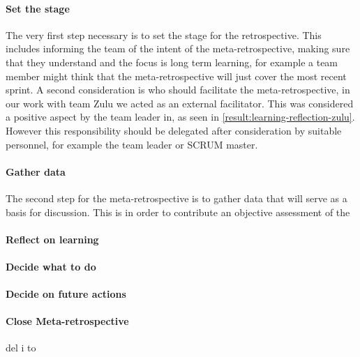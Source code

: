 \paragraph{Set the stage}
The very first step necessary is to set the stage for the retrospective. This includes informing the team of the intent of the meta-retrospective, making sure that they understand and the focus is long term learning, for example a team member might think that the meta-retrospective will just cover the most recent sprint. A second consideration is who should facilitate the meta-retrospective, in our work with team Zulu we acted as an external facilitator. This was considered a positive aspect by the team leader in, as seen in \autoref{result:learning-reflection-zulu}. However this responsibility should be delegated after consideration by suitable personnel, for example the team leader or SCRUM master. 

\paragraph{Gather data}
The second step for the meta-retrospective is to gather data that will serve as a basis for discussion. This is in order to contribute an objective assessment of the 

\paragraph{Reflect on learning}

\paragraph{Decide what to do}

\paragraph{Decide on future actions} %
\label{par:paragraph_name}

\paragraph{Close Meta-retrospective} %
\label{par:paragraph_name}
del i to





